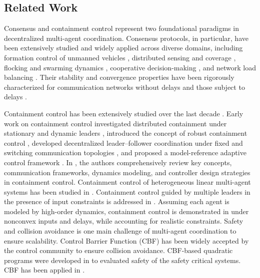 \documentclass[journal]{IEEEtran}
\theoremstyle{definition}
\theoremstyle{plain}
\begin{document}
\subsection{Related Work}
Consensus and containment control represent two foundational paradigms in decentralized multi-agent coordination. Consensus protocols, in particular, have been extensively studied and widely applied across diverse domains, including formation control of unmanned vehicles \cite{chang2025consensus, ma2024consensus}, distributed sensing and coverage \cite{facinelli2019gas, pasek2022review}, flocking and swarming dynamics \cite{fernando2021flocking, epp2024ota}, cooperative decision-making \cite{stankovic2023tdlearning, bassolillo2025mh}, and network load balancing \cite{brooks1996sensorfusion, pasek2022review}. Their stability and convergence properties have been rigorously characterized for communication networks without delays and those subject to delays \cite{olfati2004consensus, li2010consensus, li2010distributed}.

Containment control has been extensively studied over the last decade
\cite{thummalapeta2023survey,haghshenas2015containment,li2021containment,bechlioulis2024robust,xu2025containment}.
Early work on containment control investigated distributed containment under stationary and dynamic leaders \cite{wang2010distributed}, introduced the concept of robust containment control \cite{su2011robust}, developed decentralized leader–follower coordination under fixed and switching communication topologies \cite{ni2010leader}, and proposed a model-reference adaptive control framework \cite{meng2010distributed}. In \cite{thummalapeta2023survey}, the authors comprehensively review key concepts, communication frameworks, dynamics modeling, and controller design strategies in containment control. Containment control of heterogeneous linear multi-agent systems has been studied in \cite{wang2010distributed,haghshenas2015containment}. Containment control guided by multiple leaders in the presence of input constraints is addressed in \cite{li2021containment}. Assuming each agent is modeled by high-order dynamics, containment control is demonstrated in \cite{meng2010distributed} under nonconvex inputs and delays, while accounting for realistic constraints. Safety and collision avoidance is one main challenge of multi-agent coordination to ensure scalability. Control Barrier Function (CBF) has been widely accepted by the control community to ensure collision avoidance. CBF-based quadratic programs were developed in \cite{ames2017control} to evaluated safety of the safety critical systems. CBF has been applied in \cite{notomista2020constraint, wang2017safety, glotfelter2017nonsmooth}. 
\end{document}
